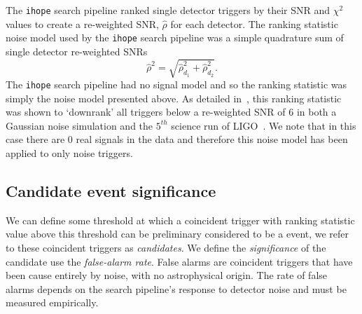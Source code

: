 The \texttt{ihope} search pipeline ranked single detector triggers by their SNR and $\chi^{2}$ values to create a re-weighted SNR, $\hat{\rho}$ for each detector. The ranking statistic noise model used by the \texttt{ihope} search pipeline was a simple quadrature sum of single detector re-weighted SNRs
%
\begin{equation}
    \hat{\rho}^{2} = \sqrt{\hat{\rho}^{2}_{d_{1}} + \hat{\rho}^{2}_{d_{2}}}.
    \label{2:eq:IHOPE_noise_model}
\end{equation}
%
The \texttt{ihope} search pipeline had no signal model and so the ranking statistic was simply the noise model presented above. As detailed in~\cite{IHOPE:2012zx}, this ranking statistic was shown to `downrank' all triggers below a re-weighted SNR of $6$ in both a Gaussian noise simulation and the $5^{th}$ science run of LIGO~\cite{S5:2012}. We note that in this case there are $0$ real signals in the data and therefore this noise model has been applied to only noise triggers.

\subsection{\label{2:sec:background-estimation}Candidate event significance}

We can define some threshold at which a coincident trigger with ranking statistic value above this threshold can be preliminary considered to be a \gwadj event, we refer to these coincident triggers as \textit{candidates}. We define the \textit{significance} of the candidate use the \textit{false-alarm rate}. False alarms are coincident triggers that have been cause entirely by noise, with no astrophysical origin. The rate of false alarms depends on the search pipeline's response to detector noise and must be measured empirically.

